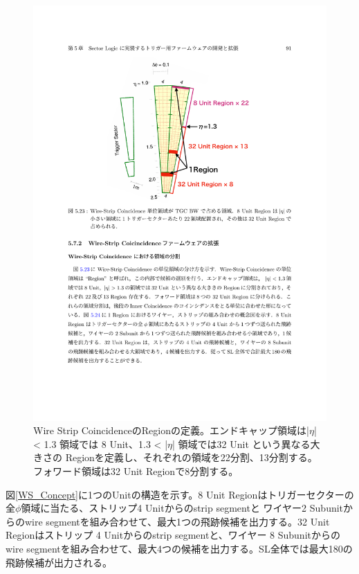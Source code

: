 \begin{figure} 
\centering
\includegraphics[width=12cm]{fig/SL/WS_region.pdf}
\caption[Wire Strip Coincidence以降のRegionの分割]{Wire Strip CoincidenceのRegionの定義\cite{mt_kawamoto}。エンドキャップ領域は|$\eta$| < 1.3 領域では 8 Unit、1.3 < |$\eta$| 領域では32 Unit という異なる大きさの Regionを定義し、それぞれの領域を22分割、13分割する。フォワード領域は32 Unit Regionで8分割する。
}
\label{WS_region}
\end{figure}

図\ref{WS_Concept}に1つのUnitの構造を示す。8 Unit Regionはトリガーセクターの全$\phi$領域に当たる、ストリップ4 Unitからのstrip segmentと ワイヤー2 Subunitからのwire segmentを組み合わせて、最大1つの飛跡候補を出力する。32 Unit Regionはストリップ 4 Unitからのstrip segmentと、ワイヤー 8 Subunitからのwire segmentを組み合わせて、最大4つの候補を出力する。SL全体では最大180の飛跡候補が出力される。

